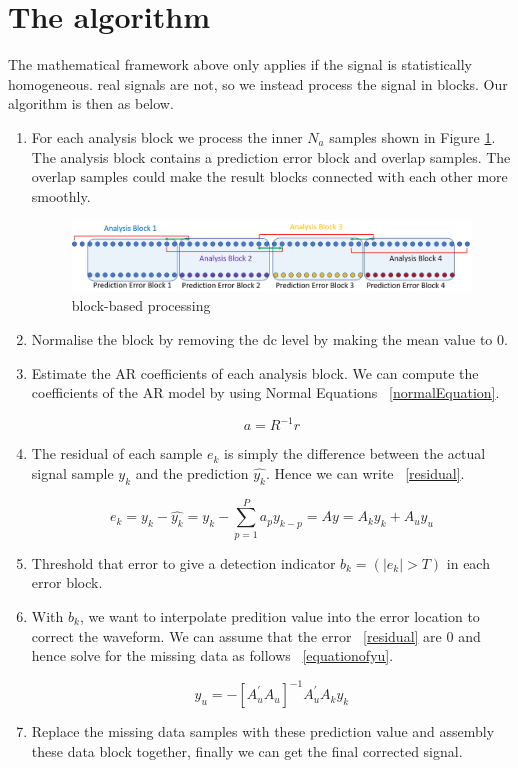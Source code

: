 \documentclass[11pt, a4paper]{article}
\begin{document}
\section{The algorithm}
The mathematical framework above only applies if the signal is statistically homogeneous. real signals are not, so we instead process the signal in blocks. Our algorithm is then as below.
\begin{enumerate}
    \item For each analysis block we process the inner $N_a$ samples shown in Figure \ref{fig3}. The analysis block contains a prediction error block and overlap samples. The overlap samples could make the result blocks connected with each other more smoothly.
    \begin{figure}[h]
    	\centering
    	\includegraphics[width = .8\textwidth]{fig/fig3}
    	\caption{block-based processing}
    	\label{fig3}
    \end{figure} 
    \item Normalise the block by removing the dc level by making the mean value to 0.
    \item Estimate the AR coefficients of each analysis block.
    We can compute the coefficients of the AR model by using Normal Equations ~\ref{normalEquation}.
    
    \begin{equation}
    	a = R^{-1}r
    	\label{normalEquation}
    \end{equation}
    \item The residual of each sample $e_k$ is simply the difference between the actual signal sample $y_k$ and the prediction $\hat{y_k}$. Hence we can write ~\ref{residual}.
    
    \begin{equation}
    	e_k = y_k - \hat{y_k} = y_k - \sum_{p = 1}^{P} a_py_{k-p} = Ay = A_ky_k + A_uy_u
    	\label{residual}
    \end{equation}
    
    \item Threshold that error to give a detection indicator $b_k = (|e_k| > T)$ in each error block.
    \item With $b_k$, we want to interpolate predition value into the error location to correct the waveform. We can assume that the error ~\ref{residual} are 0 and hence solve for the missing data as follows ~\ref{equationofyu}.
    
    \begin{equation}
    	y_u = -{[A^{'}_{u}A_{u}]}^{-1}A^{'}_{u}A_{k}y_{k}
    	\label{equationofyu}
    \end{equation}
    
    \item Replace the missing data samples with these prediction value and assembly these data block together, finally we can get the final corrected signal.
    
\end{enumerate}
\end{document}
